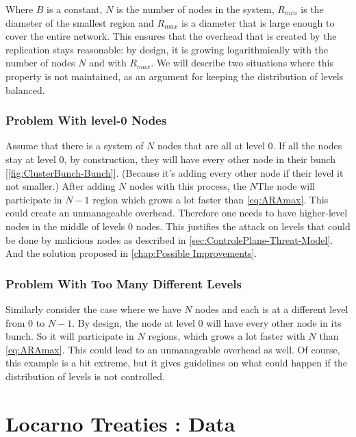 \documentclass[a4paper,11pt,oneside]{report}
\begin{document}
Where $B$ is a constant, $N$ is the number of nodes in the system, $R_{min}$ is the diameter of the smallest region and $R_{max}$ is a diameter that is large enough to cover the entire network. This ensures that the overhead that is created by the replication stays reasonable: by design, it is growing logarithmically with the number of nodes $N$ and with $R_{max}$. We will describe two situations where this property is not maintained, as an argument for keeping the distribution of levels balanced.

\subsection{Problem With level-0 Nodes} \label{app:levels-zero}
Assume that there is a system of $N$ nodes that are all at level 0. If all
the nodes stay at level 0, by construction, they will have every other node in
their bunch [\autoref{fig:ClusterBunch-Bunch}]. (Because it’s adding every other node if their level it not
smaller.) After adding $N$ nodes with this process, the $N$The node will participate
in $N-1$ region which grows a lot faster than \autoref{eq:ARAmax}. This could create an unmanageable overhead. Therefore one needs to have higher-level nodes in the middle of levels 0 nodes. This justifies the attack on levels that could be done by malicious nodes as described in \autoref{sec:ControlePlane-Threat-Model}. And the solution proposed in \autoref{chap:Possible Improvements}.

\subsection{Problem With Too Many Different Levels}
Similarly consider the case where we have $N$ nodes and each is at a different level from $0$ to $N-1$. By design, the node at level $0$ will have every other node in its bunch. So it will participate in $N$ regions, which grows a lot faster with $N$ than \autoref{eq:ARAmax}. This could lead to an unmanageable overhead as well. Of course, this example is a bit extreme, but it gives guidelines on what could happen if the distribution of levels is not controlled.

\chapter{Locarno Treaties : Data} \label{app:LocarnoTreaties-data}
\end{document}
